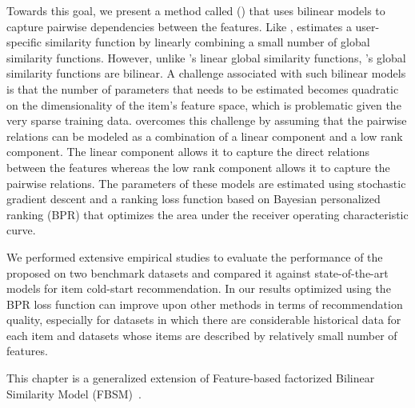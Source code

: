 Towards this goal, we present a method called \CFEXPB (\CF) that uses bilinear
models to capture pairwise dependencies between the features. Like \CFLIN, \CF
estimates a user-specific similarity function by linearly combining a small
number of global similarity functions. However, unlike \CFLIN's linear global
similarity functions, \CF's global similarity functions are bilinear.
A challenge associated with such bilinear models is that the number of
parameters that needs to be estimated becomes quadratic on the dimensionality of
the item's feature space, which is problematic given the very sparse training
data. \CF overcomes this challenge by assuming that the pairwise relations can
be modeled as a combination of a linear component and a low rank component. The
linear component allows it to capture the direct relations between the features
whereas the low rank component allows it to capture the pairwise
relations. 
The parameters of these models are
estimated using stochastic gradient descent and a ranking loss function based on
Bayesian personalized ranking (BPR) that optimizes the area under the receiver
operating characteristic curve.

We performed extensive empirical studies to evaluate the performance of the proposed
\CF on two benchmark datasets and compared it against state-of-the-art models for
item cold-start recommendation. In our results \CF optimized using the BPR loss function can
improve upon other methods in terms of recommendation quality, especially for
datasets in which there are considerable historical data for each item and
datasets whose items are described by relatively small number of features.

This chapter is a generalized extension of Feature-based factorized  Bilinear Similarity Model (FBSM)~\cite{r43}.

\iffalse
Rest of the chapter is organized as follow: 
Section~\ref{ch:bilinear:method} %
describes \CF and optimization methods that are used to estimate
model parameters. Section~\ref{ch:bilinear:experiments}  %
shows the evaluation methodology and section~\ref{ch:bilinear:results} %
discusses the results. 
Section~\ref{ch:bilinear:conclusion} %
concludes the work in the chapter.
\fi